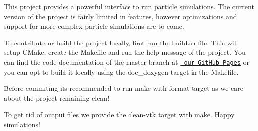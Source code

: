 \label{index_md_README}%
%
 This project provides a powerful interface to run particle simulations. The current version of the project is fairly limited in features, however optimizations and support for more complex particle simulations are to come.

To contribute or build the project locally, first run the {\ttfamily build.\+sh} file. This will setup CMake, create the Makefile and run the help message of the project. You can find the code documentation of the master branch at \href{https://anatoly03.github.io/MolSim-WS25-GroupA/index.html}{\texttt{ our Git\+Hub Pages}} or you can opt to build it locally using the {\ttfamily doc\+\_\+doxygen} target in the Makefile.

Before commiting it\textquotesingle{}s recommended to run make with {\ttfamily format} target as we care about the project remaining clean!

To get rid of output files we provide the {\ttfamily clean-\/vtk} target with make. Happy simulations! 